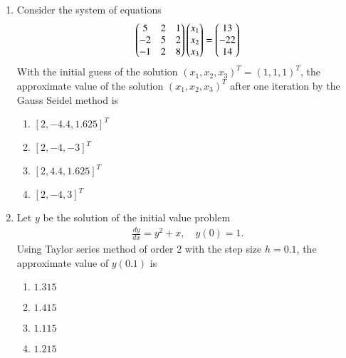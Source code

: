 \documentclass[journal]{IEEEtran}
\numberwithin{equation}{enumi}
\numberwithin{figure}{enumi}
\begin{document}
\begin{enumerate}
\item Consider the system of equations
\begin{align*}
\begin{pmatrix}
5 & 2 & 1 \\
-2 & 5 & 2 \\
-1 & 2 & 8
\end{pmatrix}
\begin{pmatrix}
x_1 \\ x_2 \\ x_3
\end{pmatrix}
=
\begin{pmatrix}
13 \\ -22 \\ 14
\end{pmatrix}
\end{align*}
With the initial guess of the solution $(x_1, x_2, x_3)^T = (1, 1, 1)^T$, the approximate value of the solution $(x_1, x_2, x_3)^T$ after one iteration by the Gauss Seidel method is

\hfill{}
\begin{multicols}{2}
\begin{enumerate}
    \item $[2, -4.4, 1.625]^T$
    \item $[2, -4, -3]^T$
    \item  $[2, 4.4, 1.625]^T$ 
    \item $[2, -4, 3]^T$

\end{enumerate}
\end{multicols}



\item Let $y$ be the solution of the initial value problem
\begin{align*}
\frac{dy}{dx} = y^2 + x, \quad y(0) = 1.
\end{align*}
Using Taylor series method of order 2 with the step size $h = 0.1$, the approximate value of $y(0.1)$ is
\hfill{}
\begin{multicols}{4}
\begin{enumerate}
    \item $1.315$ 
    \item $1.415$
    \item $1.115$
    \item $1.215$

\end{enumerate}
\end{multicols}



\end{enumerate}
\end{document}
